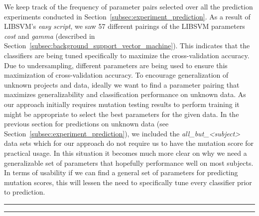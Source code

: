 \noindent
We keep track of the frequency of parameter pairs selected over all the prediction experiments conducted in Section~\ref{subsec:experiment_prediction}. As a result of LIBSVM's \emph{easy script}, we saw 57 different pairings of the LIBSVM parameters \emph{cost} and \emph{gamma} (described in Section~\ref{subsec:background_support_vector_machine}). This indicates that the classifiers are being tuned specifically to maximize the cross-validation accuracy. Due to undersampling, different parameters are being used to ensure this maximization of cross-validation accuracy. To encourage generalization of unknown projects and data, ideally we want to find a parameter pairing that maximizes generalizability and classification performance on unknown data. As our approach initially requires mutation testing results to perform training it might be appropriate to select the best parameters for the given data. In the previous section for predictions on unknown data (see Section~\ref{subsec:experiment_prediction}), we included the \emph{all\_but\_<subject>} data sets which for our approach do not require us to have the mutation score for practical usage. In this situation it becomes much more clear on why we need a generalizable set of parameters that hopefully performance well on most subjects. In terms of usability if we can find a general set of parameters for predicting mutation scores, this will lessen the need to specifically tune every classifier prior to prediction.

\begin{sidewaysfigure}[h]
  \centering

  \vspace{2mm}
  \hrule
	\vspace{3em}

  \centering
  \vspace{2mm}
  \hrule
\end{sidewaysfigure}

